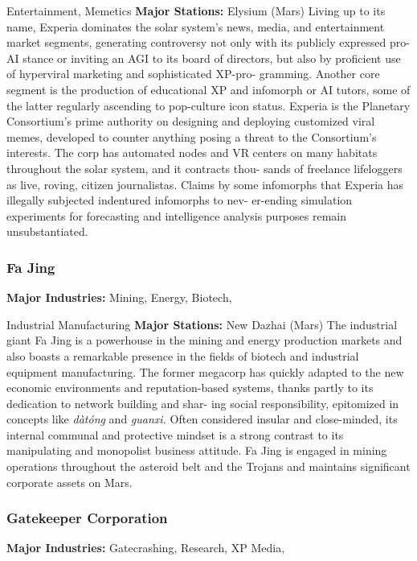 Entertainment, Memetics
\textbf{Major Stations:} Elysium (Mars)
Living up to its name, Experia dominates the solar 
system's news, media, and entertainment market 
segments, generating controversy not only with its 
publicly expressed pro-AI stance or inviting an AGI 
to its board of directors, but also by proficient use 
of hyperviral marketing and sophisticated XP-pro-
gramming. Another core segment is the production 
of educational XP and infomorph or AI tutors, some 
of the latter regularly ascending to pop-culture icon 
status. Experia is the Planetary Consortium's prime 
authority on designing and deploying customized 
viral memes, developed to counter anything posing 
a threat to the Consortium's interests. The corp has 
automated nodes and VR centers on many habitats 
throughout the solar system, and it contracts thou-
sands of freelance lifeloggers as live, roving, citizen 
journalistas. Claims by some infomorphs that Experia 
has illegally subjected indentured infomorphs to nev-
er-ending simulation experiments for forecasting and 
intelligence analysis purposes remain unsubstantiated.

\subsubsection{Fa Jing}

\textbf{Major Industries:} Mining, Energy, Biotech, 

Industrial Manufacturing
\textbf{Major Stations:} New Dazhai (Mars)
The industrial giant Fa Jing is a powerhouse in the 
mining and energy production markets and also 
boasts a remarkable presence in the fields of biotech 
and industrial equipment manufacturing. The former 
megacorp has quickly adapted to the new economic 
environments and reputation-based systems, thanks 
partly to its dedication to network building and shar-
ing social responsibility, epitomized in concepts like 
\textit{dàtóng} and \textit{guanxi.} Often considered insular and 
close-minded, its internal communal and protective 
mindset is a strong contrast to its manipulating and 
monopolist business attitude. Fa Jing is engaged in 
mining operations throughout the asteroid belt and 
the Trojans and maintains significant corporate assets 
on Mars.

\subsubsection{Gatekeeper Corporation}

\textbf{Major Industries:} Gatecrashing, Research, XP Media, 


